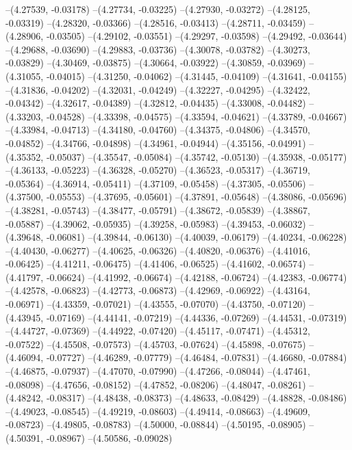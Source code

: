 --(4.27539, -0.03178)
--(4.27734, -0.03225)
--(4.27930, -0.03272)
--(4.28125, -0.03319)
--(4.28320, -0.03366)
--(4.28516, -0.03413)
--(4.28711, -0.03459)
--(4.28906, -0.03505)
--(4.29102, -0.03551)
--(4.29297, -0.03598)
--(4.29492, -0.03644)
--(4.29688, -0.03690)
--(4.29883, -0.03736)
--(4.30078, -0.03782)
--(4.30273, -0.03829)
--(4.30469, -0.03875)
--(4.30664, -0.03922)
--(4.30859, -0.03969)
--(4.31055, -0.04015)
--(4.31250, -0.04062)
--(4.31445, -0.04109)
--(4.31641, -0.04155)
--(4.31836, -0.04202)
--(4.32031, -0.04249)
--(4.32227, -0.04295)
--(4.32422, -0.04342)
--(4.32617, -0.04389)
--(4.32812, -0.04435)
--(4.33008, -0.04482)
--(4.33203, -0.04528)
--(4.33398, -0.04575)
--(4.33594, -0.04621)
--(4.33789, -0.04667)
--(4.33984, -0.04713)
--(4.34180, -0.04760)
--(4.34375, -0.04806)
--(4.34570, -0.04852)
--(4.34766, -0.04898)
--(4.34961, -0.04944)
--(4.35156, -0.04991)
--(4.35352, -0.05037)
--(4.35547, -0.05084)
--(4.35742, -0.05130)
--(4.35938, -0.05177)
--(4.36133, -0.05223)
--(4.36328, -0.05270)
--(4.36523, -0.05317)
--(4.36719, -0.05364)
--(4.36914, -0.05411)
--(4.37109, -0.05458)
--(4.37305, -0.05506)
--(4.37500, -0.05553)
--(4.37695, -0.05601)
--(4.37891, -0.05648)
--(4.38086, -0.05696)
--(4.38281, -0.05743)
--(4.38477, -0.05791)
--(4.38672, -0.05839)
--(4.38867, -0.05887)
--(4.39062, -0.05935)
--(4.39258, -0.05983)
--(4.39453, -0.06032)
--(4.39648, -0.06081)
--(4.39844, -0.06130)
--(4.40039, -0.06179)
--(4.40234, -0.06228)
--(4.40430, -0.06277)
--(4.40625, -0.06326)
--(4.40820, -0.06376)
--(4.41016, -0.06425)
--(4.41211, -0.06475)
--(4.41406, -0.06525)
--(4.41602, -0.06574)
--(4.41797, -0.06624)
--(4.41992, -0.06674)
--(4.42188, -0.06724)
--(4.42383, -0.06774)
--(4.42578, -0.06823)
--(4.42773, -0.06873)
--(4.42969, -0.06922)
--(4.43164, -0.06971)
--(4.43359, -0.07021)
--(4.43555, -0.07070)
--(4.43750, -0.07120)
--(4.43945, -0.07169)
--(4.44141, -0.07219)
--(4.44336, -0.07269)
--(4.44531, -0.07319)
--(4.44727, -0.07369)
--(4.44922, -0.07420)
--(4.45117, -0.07471)
--(4.45312, -0.07522)
--(4.45508, -0.07573)
--(4.45703, -0.07624)
--(4.45898, -0.07675)
--(4.46094, -0.07727)
--(4.46289, -0.07779)
--(4.46484, -0.07831)
--(4.46680, -0.07884)
--(4.46875, -0.07937)
--(4.47070, -0.07990)
--(4.47266, -0.08044)
--(4.47461, -0.08098)
--(4.47656, -0.08152)
--(4.47852, -0.08206)
--(4.48047, -0.08261)
--(4.48242, -0.08317)
--(4.48438, -0.08373)
--(4.48633, -0.08429)
--(4.48828, -0.08486)
--(4.49023, -0.08545)
--(4.49219, -0.08603)
--(4.49414, -0.08663)
--(4.49609, -0.08723)
--(4.49805, -0.08783)
--(4.50000, -0.08844)
--(4.50195, -0.08905)
--(4.50391, -0.08967)
--(4.50586, -0.09028)
